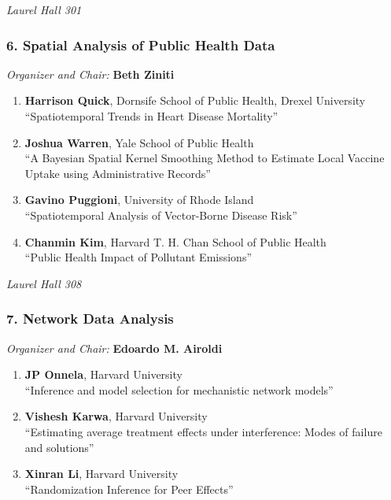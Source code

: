 \emph{Laurel Hall 301} \\[.5em]

\subsubsection*{6. Spatial Analysis of Public Health Data}

\emph{Organizer and Chair:} \textbf{Beth Ziniti}

\begin{enumerate}
\item \textbf{Harrison Quick}, Dornsife School of Public Health, Drexel University \\
``Spatiotemporal Trends in Heart Disease Mortality''
\item \textbf{Joshua Warren}, Yale School of Public Health \\
``A Bayesian Spatial Kernel Smoothing Method to Estimate Local Vaccine Uptake using Administrative Records''
\item \textbf{Gavino Puggioni}, University of Rhode Island \\
``Spatiotemporal Analysis of Vector-Borne Disease Risk''
\item \textbf{Chanmin Kim}, Harvard T. H. Chan School of Public Health \\
``Public Health Impact of Pollutant Emissions''
\end{enumerate}

\emph{Laurel Hall 308} \\[.5em]

\subsubsection*{7. Network Data Analysis}

\emph{Organizer and Chair:} \textbf{Edoardo M. Airoldi}

\begin{enumerate}
\item \textbf{JP Onnela}, Harvard University \\
``Inference and model selection for mechanistic network models''
\item \textbf{Vishesh Karwa}, Harvard University \\
``Estimating average treatment effects under interference: Modes of failure and solutions''
\item \textbf{Xinran Li}, Harvard University \\
``Randomization Inference for Peer Effects''
\end{enumerate}

